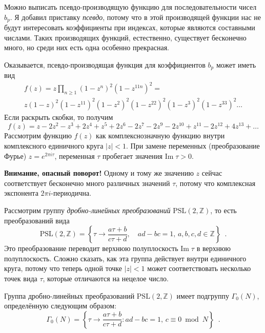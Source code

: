 \documentclass[a5paper]{article}
\theoremstyle{definition}
\begin{document}

Можно выписать псевдо-производящую функцию для последовательности чисел \( b_p
\). Я добавил приставку \textit{псевдо}, потому что в этой производящей функции нас
не будут интересовать коэффициенты при индексах, которые являются составными числами.
Таких производящих функций, естественно, существует бесконечно много, но среди
них есть одна особенно прекрасная.

Оказывается, псевдо-производящая функция для коэффициентов \( b_p \) может иметь вид
\begin{multline*}
	f(z) = z\prod_{n \geq 1}(1 - z^{n})^2(1 - z^{11 n})^{2} = \\
	z(1 - z)^2(1 - z^{11})^{2}(1 - z^2)^2(1 - z^{22})^{2}(1 - z^3)^2(1 - 
	z^{33})^{2} \ldots
\end{multline*}
Если раскрыть скобки, то получим
\[
	f(z) = z - 2z^2 - z^3 + 2z^4 + z^5 + 2z^6 - 2z^7 - 2z^9 - 2z^{10} + z^{11} 
	- 
	2z^{12} + 4z^{13} + \ldots
\]
Рассмотрим функцию \( f(z) \) как комплекснозначную функцию внутри комплексного
единичного круга \( {|z| < 1} \). При замене переменных (преобразование Фурье)
\( z = e^{2 \pi i \tau} \), переменная \( \tau \) пробегает значения \(
\mathrm{Im}\; \tau > 0 \).

\textbf{Внимание, опасный поворот!} Одному и тому же значению \( z \) сейчас
соответствует бесконечно много различных значений \( \tau \), потому что
комплексная экспонента \( 2 \pi i \)-периодична.

Рассмотрим группу \textit{дробно-линейных преобразований} \( \mathrm{PSL}(2,
\mathbb Z) \), то есть преобразований вида
\[
    \mathrm{PSL}(2, \mathbb Z) = \left\{
        \tau \to \dfrac{a \tau + b}{c \tau + d}, \quad
         ad - bc = 1, \, a, b, c, d \in \mathbb Z
    \right\} \enspace .
\]
Это преобразование переводит верхнюю полуплоскость \( \mathrm{Im}\; \tau \) в
верхнюю полуплоскость. Сложно сказать, как эта группа действует внутри
единичного круга, потому что теперь одной точке \( |z| < 1 \) может
соответствовать несколько точек вида \( \tau \), которые отличаются на нецелое
число.

Группа дробно-линейных преобразований \( \mathrm{PSL}(2, \mathbb
Z) \) имеет подгруппу \( \Gamma_0(N) \), определённую следующим образом:
\[
	\Gamma_0(N) = \left\{
		\tau \to \dfrac{a\tau + b}{c\tau + d} \colon ad - bc = 1, \, c \equiv 0
\bmod N
	\right\} \enspace .
\]
\end{document}
